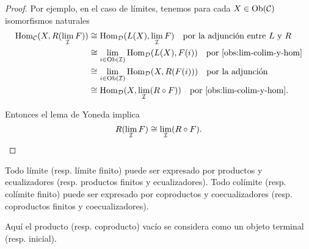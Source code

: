 \documentclass{article}
\numberwithin{equation}{section}
\theoremstyle{definition}
\begin{document}
\begin{proof}
  Por ejemplo, en el caso de límites, tenemos para cada $X \in \operatorname{Ob} (\mathcal{C})$
  isomorfismos naturales
  \begin{align*}
    \operatorname{Hom}_\mathcal{C} (X, R (\lim_\mathcal{I} F)) & \cong \operatorname{Hom}_\mathcal{D} (L (X), \lim_\mathcal{I} F) \quad \text{por la adjunción entre }L\text{ y }R \\
                                               & \cong \lim_{i\in\operatorname{Ob} (\mathcal{I})} \operatorname{Hom}_\mathcal{D} (L (X), F (i)) \quad \text{por \ref{obs:lim-colim-y-hom}} \\
                                               & \cong \lim_{i\in\operatorname{Ob} (\mathcal{I})} \operatorname{Hom}_\mathcal{D} (X, R (F (i))) \quad \text{por la adjunción} \\
                                               & \cong \operatorname{Hom}_\mathcal{D} (X, \lim_\mathcal{I} (R \circ F)) \quad \text{por \ref{obs:lim-colim-y-hom}}.
  \end{align*}

  Entonces el lema de Yoneda implica
  \[ R (\lim_\mathcal{I} F) \cong \lim_\mathcal{I} (R\circ F). \qedhere \]
\end{proof}

\begin{proposicion}
  Todo límite (resp. límite finito) puede ser expresado por productos y
  ecualizadores (resp. productos finitos y ecualizadores). Todo colímite
  (resp. colímite finito) puede ser expresado por coproductos y coecualizadores
  (resp. coproductos finitos y coecualizadores).
\end{proposicion}

Aquí el producto (resp. coproducto) vacío se considera como un objeto terminal
(resp. inicial).
\end{document}
